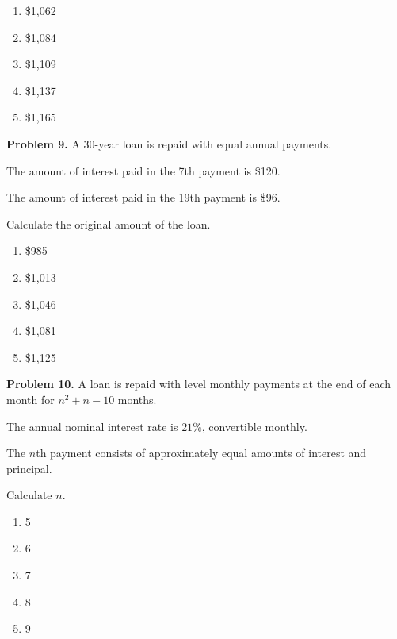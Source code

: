 \documentclass[12pt]{article}
\begin{document}
\vspace{.5cm}

\begin{enumerate}[label = \Alph*.]
\item \$1{,}062
\item \$1{,}084
\item \$1{,}109
\item \$1{,}137
\item \$1{,}165
\end{enumerate}

\newpage


\noindent \textbf{Problem 9.}
A 30-year loan is repaid with equal annual payments.

The amount of interest paid in the 7th payment is \$120.

The amount of interest paid in the 19th payment is \$96.

Calculate the original amount of the loan.

\vspace{.5cm}

\begin{enumerate}[label = \Alph*.]
\item \$985
\item \$1{,}013
\item \$1{,}046
\item \$1{,}081
\item \$1{,}125
\end{enumerate}

\newpage

\noindent \textbf{Problem 10.}
A loan is repaid with level monthly payments at the end of each month for $n^2+n-10$ months.

The annual nominal interest rate is $21\%$, convertible monthly.

The $n$th payment consists of approximately equal amounts of interest and principal.

Calculate $n$.

\vspace{.5cm}

\begin{enumerate}[label = \Alph*.]
\item 5
\item 6
\item 7
\item 8
\item 9
\end{enumerate}




\newpage
\end{document}
